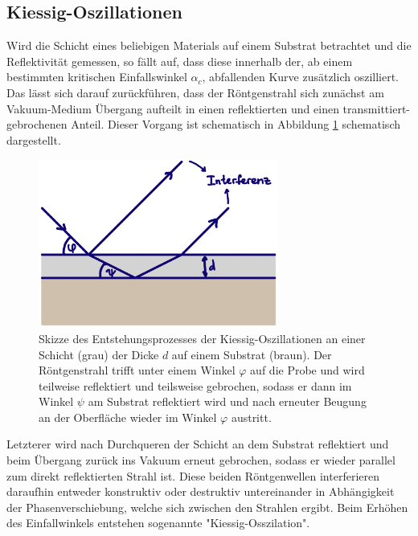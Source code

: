     \subsection{Kiessig-Oszillationen}
    \label{sec:KO}
        Wird die Schicht eines beliebigen Materials auf einem Substrat betrachtet und die Reflektivität gemessen,
        so fällt auf, dass diese innerhalb der, ab einem bestimmten kritischen Einfallswinkel $\alpha_c$,
        abfallenden Kurve zusätzlich oszilliert.
        Das lässt sich darauf zurückführen, dass der Röntgenstrahl sich zunächst am Vakuum-Medium Übergang
        aufteilt in einen reflektierten und einen transmittiert-gebrochenen Anteil.
        Dieser Vorgang ist schematisch in Abbildung \ref{fig:Kiessig} schematisch dargestellt.
        \begin{figure}[h]
            \centering
            \includegraphics[width = 0.7\textwidth]{pictures/Kiessig.png}
            \caption{Skizze des Entstehungsprozesses der Kiessig-Oszillationen an einer Schicht (grau) der Dicke $d$ auf einem Substrat (braun).
                        Der Röntgenstrahl trifft unter einem Winkel $\varphi$ auf die Probe und wird teilweise reflektiert und teilsweise gebrochen,
                        sodass er dann im Winkel $\psi$ am Substrat reflektiert wird und nach erneuter Beugung an der Oberfläche wieder im Winkel $\varphi$ austritt.}
            \label{fig:Kiessig}
        \end{figure}
        Letzterer wird nach Durchqueren der Schicht an dem Substrat reflektiert und beim Übergang zurück ins Vakuum erneut gebrochen,
        sodass er wieder parallel zum direkt reflektierten Strahl ist.
        Diese beiden Röntgenwellen interferieren daraufhin entweder konstruktiv oder destruktiv untereinander
        in Abhängigkeit der Phasenverschiebung, welche sich zwischen den Strahlen ergibt.
        Beim Erhöhen des Einfallwinkels entstehen sogenannte "Kiessig-Osszilation".
